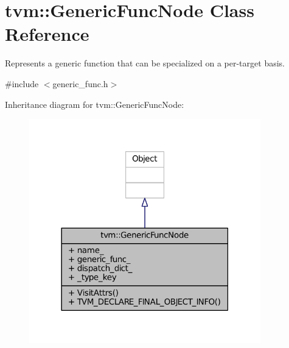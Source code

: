 \hypertarget{classtvm_1_1GenericFuncNode}{}\section{tvm\+:\+:Generic\+Func\+Node Class Reference}
\label{classtvm_1_1GenericFuncNode}


Represents a generic function that can be specialized on a per-\/target basis.  




{\ttfamily \#include $<$generic\+\_\+func.\+h$>$}



Inheritance diagram for tvm\+:\+:Generic\+Func\+Node\+:
\nopagebreak
\begin{figure}[H]
\begin{center}
\leavevmode
\includegraphics[width=285pt]{classtvm_1_1GenericFuncNode__inherit__graph}
\end{center}
\end{figure}


